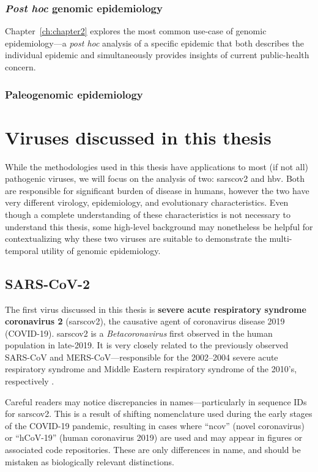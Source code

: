 \subsubsection{\textit{Post hoc} genomic epidemiology}
Chapter~\ref{ch:chapter2} explores the most common use-case of genomic epidemiology---a \textit{post hoc} analysis of a specific epidemic that both describes the individual epidemic and simultaneously provides insights of current public-health concern.

\subsubsection{Paleogenomic epidemiology}


\section{Viruses discussed in this thesis}
While the methodologies used in this thesis have applications to most (if not all) pathogenic viruses, we will focus on the analysis of two: \gls{sarscov2} and \gls{hbv}.
Both are responsible for significant burden of disease in humans, however the two have very different virology, epidemiology, and evolutionary characteristics.
Even though a complete understanding of these characteristics is not necessary to understand this thesis, some high-level background may nonetheless be helpful for contextualizing why these two viruses are suitable to demonstrate the multi-temporal utility of genomic epidemiology.

\subsection{SARS-CoV-2}
The first virus discussed in this thesis is \textbf{severe acute respiratory syndrome coronavirus 2} (\gls{sarscov2}), the causative agent of coronavirus disease 2019 (COVID-19).
\gls{sarscov2} is a \textit{Betacoronavirus} first observed in the human population in late-2019.
It is very closely related to the previously observed SARS-CoV and MERS-CoV---responsible for the 2002--2004 severe acute respiratory syndrome and Middle Eastern respiratory syndrome of the 2010's, respectively \cite{gorbalenya2020species}.
    
Careful readers may notice discrepancies in names---particularly in sequence IDs for \gls{sarscov2}.
This is a result of shifting nomenclature used during the early stages of the COVID-19 pandemic, resulting in cases where ``ncov'' (novel coronavirus) or ``hCoV-19'' (human coronavirus 2019) are used and may appear in figures or associated code repositories.
These are only differences in name, and should be mistaken as biologically relevant distinctions.

